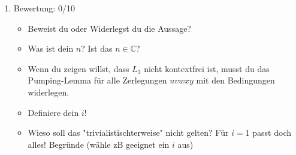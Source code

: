 \documentclass[11pt]{article}
\begin{document}
\begin{enumerate}[label=\alph*)]
\item Bewertung: 0/10
\begin{itemize}
\item Beweist du oder Widerlegst du die Aussage?
\item Was ist dein $n$? Ist das $n\in\mathbb{C}$?
\item Wenn du zeigen willst, dass $L_3$ nicht kontextfrei ist, musst du das Pumping-Lemma für alle Zerlegungen $uvwxy$ mit den Bedingungen widerlegen.
\item Definiere dein $i$!
\item Wieso soll das "trivialistischterweise" nicht gelten? Für $i=1$ passt doch alles! Begründe (wähle zB geeignet ein $i$ aus)
\end{itemize}
\end{enumerate}
\end{document}
